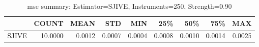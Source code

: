 \begin{table}[ht]
\centering
\caption{mse summary: Estimator=SJIVE, Instruments=250, Strength=0.90}
\begin{tabular}{lrrrrrrrr}
\toprule
 & COUNT & MEAN & STD & MIN & 25\% & 50\% & 75\% & MAX \\
\midrule
SJIVE & 10.0000 & 0.0012 & 0.0007 & 0.0004 & 0.0008 & 0.0010 & 0.0014 & 0.0025 \\
\bottomrule
\end{tabular}
\end{table}
